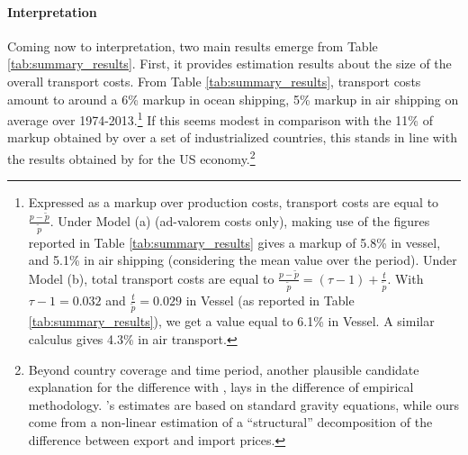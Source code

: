 \documentclass[a4paper,11pt]{article}
\begin{document}
\paragraph{Interpretation} Coming now to interpretation, two main results emerge from Table \ref{tab:summary_results}.
First, it provides estimation results about the size of the overall transport costs.
From Table \ref{tab:summary_results}, transport costs amount to around a 6\% markup in ocean shipping, 5\% markup in air shipping on average over 1974-2013.\footnote{Expressed as a markup over production costs, transport costs are equal to $\frac{p-\widetilde{p}}{\widetilde{p}}$.
Under Model (a) (ad-valorem costs only), making use of the figures reported in Table \ref{tab:summary_results} gives a markup of 5.8\% in vessel, and 5.1\% in air shipping (considering the mean value over the period).
Under Model (b), total transport costs are equal to $\frac{p-\widetilde{p}}{\widetilde{p}} = (\tau-1) + \frac{t}{\widetilde{p}}$.
With $\tau-1= 0.032$ and $\frac{t}{\widetilde{p}}= 0.029$ in Vessel (as reported in Table \ref{tab:summary_results}), we get a value equal to 6.1\% in Vessel.
A similar calculus gives 4.3\% in air transport.} If this seems modest in comparison with the 11\% of markup obtained by \citet{anderson_wincoop_jel} over a set of industrialized countries, this stands in line with the results obtained by \citet{hummels2007} for the US economy.\footnote{Beyond country coverage and time period, another plausible candidate explanation for the difference with \citet{anderson_wincoop_jel}, lays in the difference of empirical methodology.
\citet{anderson_wincoop_jel}'s estimates are based on standard gravity equations, while ours come from a non-linear estimation of a ``structural'' decomposition of the difference between export and import prices.}
\end{document}
